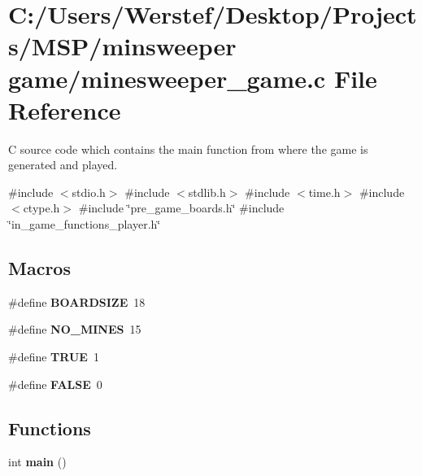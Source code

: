\section{C\+:/\+Users/\+Werstef/\+Desktop/\+Projects/\+M\+S\+P/minsweeper game/minesweeper\+\_\+game.c File Reference}
\label{minesweeper__game_8c}


C source code which contains the main function from where the game is generated and played.  


{\ttfamily \#include $<$stdio.\+h$>$}\newline
{\ttfamily \#include $<$stdlib.\+h$>$}\newline
{\ttfamily \#include $<$time.\+h$>$}\newline
{\ttfamily \#include $<$ctype.\+h$>$}\newline
{\ttfamily \#include \char`\"{}pre\+\_\+game\+\_\+boards.\+h\char`\"{}}\newline
{\ttfamily \#include \char`\"{}in\+\_\+game\+\_\+functions\+\_\+player.\+h\char`\"{}}\newline
\subsection*{Macros}
\begin{DoxyCompactItemize}
\item 
\mbox{\label{minesweeper__game_8c_a9f23dc19fb2ebde82333db1a7d765390}} 
\#define {\bfseries B\+O\+A\+R\+D\+S\+I\+ZE}~18
\item 
\mbox{\label{minesweeper__game_8c_a52b138f797faa255d3b6704af60700ed}} 
\#define {\bfseries N\+O\+\_\+\+M\+I\+N\+ES}~15
\item 
\mbox{\label{minesweeper__game_8c_aa8cecfc5c5c054d2875c03e77b7be15d}} 
\#define {\bfseries T\+R\+UE}~1
\item 
\mbox{\label{minesweeper__game_8c_aa93f0eb578d23995850d61f7d61c55c1}} 
\#define {\bfseries F\+A\+L\+SE}~0
\end{DoxyCompactItemize}
\subsection*{Functions}
\begin{DoxyCompactItemize}
\item 
\mbox{\label{minesweeper__game_8c_ae66f6b31b5ad750f1fe042a706a4e3d4}} 
int {\bfseries main} ()
\end{DoxyCompactItemize}
